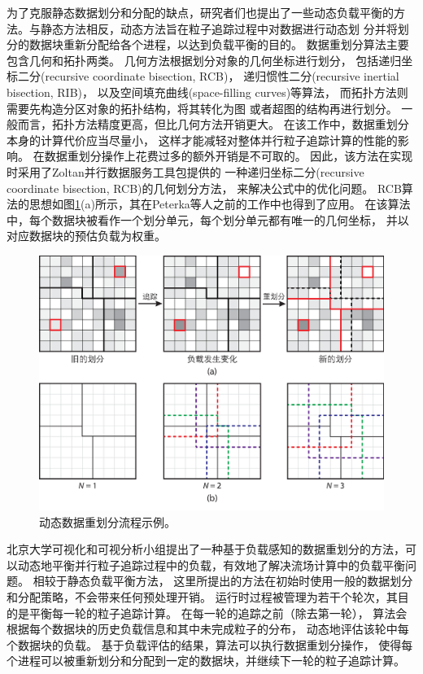 为了克服静态数据划分和分配的缺点，研究者们也提出了一些动态负载平衡的方 法。与静态方法相反，动态方法旨在粒子追踪过程中对数据进行动态划 分并将划分的数据块重新分配给各个进程，以达到负载平衡的目的。
数据重划分算法主要包含几何和拓扑两类。
几何方法根据划分对象的几何坐标进行划分，
包括递归坐标二分(recursive coordinate bisection, RCB)\parencite{BergerB87}，
递归惯性二分(recursive inertial bisection, RIB)\parencite{Simon91}，
以及空间填充曲线(space-filling curves)\parencite{PilkingtonB94}等算法，
而拓扑方法则需要先构造分区对象的拓扑结构，将其转化为图\parencite{GeorgeV96}
或者超图\parencite{CatalyurekBDBHR07}的结构再进行划分。
一般而言，拓扑方法精度更高，但比几何方法开销更大。
在该工作中，数据重划分本身的计算代价应当尽量小，
这样才能减轻对整体并行粒子追踪计算的性能的影响。
在数据重划分操作上花费过多的额外开销是不可取的。
因此，该方法在实现时采用了Zoltan并行数据服务工具包\parencite{DevineBHHV02}提供的
一种递归坐标二分(recursive coordinate bisection, RCB)的几何划分方法\parencite{BergerB87}，
来解决公式中的优化问题。
RCB算法的思想如图\ref{fig:dynamicdr:repartition}(a)所示，其在Peterka等人之前的工作\parencite{PeterkaRNLSKH11}中也得到了应用。
在该算法中，每个数据块被看作一个划分单元，每个划分单元都有唯一的几何坐标，
并以对应数据块的预估负载为权重。

\begin{figure}[!tb]
  \centering
  \includegraphics[width=.85\linewidth]{image/loadbalance/repartition.eps}
  \caption{
    动态数据重划分流程示例。\parencite{ZhangGYP18}
  }
  \label{fig:dynamicdr:repartition}
\end{figure}

北京大学可视化和可视分析小组提出了一种基于负载感知的数据重划分的方法\parencite{ZhangGYP18}，可以动态地平衡并行粒子追踪过程中的负载，有效地了解决流场计算中的负载平衡问题。
相较于静态负载平衡方法，
这里所提出的方法在初始时使用一般的数据划分和分配策略，不会带来任何预处理开销。
运行时过程被管理为若干个轮次，其目的是平衡每一轮的粒子追踪计算。
在每一轮的追踪之前（除去第一轮），
算法会根据每个数据块的历史负载信息和其中未完成粒子的分布，
动态地评估该轮中每个数据块的负载。
基于负载评估的结果，算法可以执行数据重划分操作，
使得每个进程可以被重新划分和分配到一定的数据块，并继续下一轮的粒子追踪计算。

